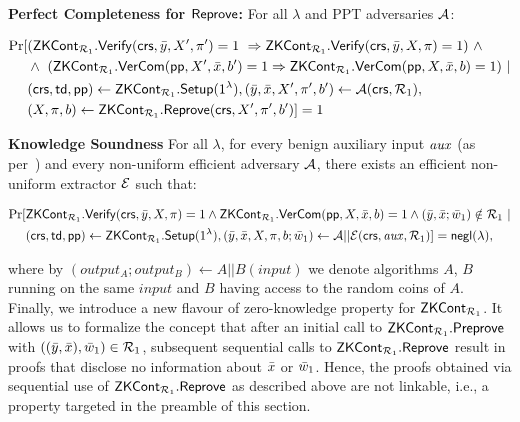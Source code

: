 \begin{definition}[ZK Continuation]
\begin{footnotesize}
\end{footnotesize}

\noindent \textbf{Perfect Completeness for ${\mathsf{Reprove}}$:} For all $\lambda$ and PPT adversaries $\mathcal{A}$: 
\begin{footnotesize}
\begin{align*}
\Pr [& (\ZKCont_{\relone}.\Verify(\crs, \bar{y}, X', \pi') = 1 \  \Rightarrow \ZKCont_{\relone}.\Verify(\crs, \bar{y}, X, \pi) = 1)  \ \wedge \ \\
                   &\wedge \ (\ZKCont_{\relone}.\VerifyCom (\pp, X', \barx, b') = 1  \Rightarrow  \ZKCont_{\relone}.\VerifyCom (\pp, X, \barx, b) = 1) \ | \\
                   & (\crs, \tw, \pp) \leftarrow \ZKCont_{\relone}.\Setup (1^{\lambda}),  (\bary, \barx, X', \pi', b') \leftarrow \adv(\crs,\relone), \\
                   & (X, \pi, b) \leftarrow \ZKCont_{\relone}.\Reprove(\crs, X', \pi', b')] = 1
\end{align*}
\end{footnotesize}

\noindent \textbf{Knowledge Soundness} For all $\lambda$, for every benign auxiliary input $\mathit{aux}$ (as per~\cite{bening_auxiliary}) and 
every non-uniform efficient adversary $\mathcal{A}$, there exists an efficient non-uniform extractor  $ \mathcal{E} $ such that:
\begin{footnotesize}
\begin{align*}
\Pr [& {\mathsf{ZKCont}}_{\mathcal{R}_1}.{\mathsf{Verify}}(\mathsf{crs}, \bar{y}, X, \pi) = 1  \wedge {\ensuremath{\mathsf{ZKCont}}}_{\mathcal{R}_1}.{\mathsf{VerCom}}(\mathsf{pp}, X, \bar{x}, b) = 1  \wedge (\bar{y}, \bar{x}; \bar{w}_1) \notin \mathcal{R}_1\ | \\
                   & (\mathsf{crs}, \mathsf{td}, \mathsf{pp}) \leftarrow {\ensuremath{\mathsf{ZKCont}}}_{\mathcal{R}_1}.{\mathsf{Setup}} (1^{\lambda}), (\bar{y}, \bar{x}, X, \pi, b; \bar{w}_1 ) \leftarrow \mathcal{A} || \mathcal{E}(\mathsf{crs}, \mathit{aux}, \mathcal{R}_1)] = \mathsf{negl} (\lambda),
\end{align*}
\end{footnotesize}

\noindent where by $(\mathit{output_{A}};\mathit{output_{B}}) \leftarrow A || B(\mathit{input})$ we denote algorithms $A$, $B$ running on the same 
$\mathit{input}$ and $B$ having access to the random coins of $A$. \\

 Finally, we introduce a new flavour of zero-knowledge property for $ {\mathsf{ZKCont}}_{\mathcal{R}_1} $. It allows us to formalize the concept that after an initial call to ${\mathsf{ZKCont}}_{\mathcal{R}_1}.{\mathsf{Preprove}}$ with $((\bar{y}, \bar{x}), \bar{w}_1) \in \mathcal{R}_1$, subsequent sequential calls to $ {\mathsf{ZKCont}}_{\mathcal{R}_1}.{\mathsf{Reprove}} $ result in proofs that disclose no information about $\bar{x}$ or $\bar{w}_1$.
Hence, the proofs obtained via sequential use of $ {\mathsf{ZKCont}}_{\mathcal{R}_1}.{\mathsf{Reprove}} $ as described above are not linkable, i.e., a property targeted  in the preamble of this section. 


\end{definition}
